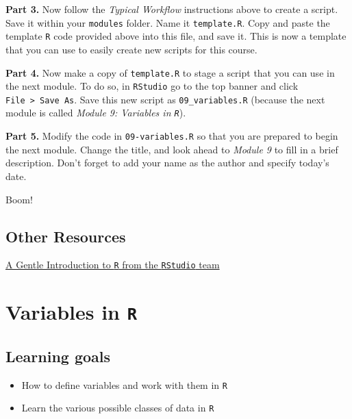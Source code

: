 \documentclass[
]{book}
\providecommand{\tightlist}{%
  \setlength{\itemsep}{0pt}\setlength{\parskip}{0pt}}
\begin{document}
\textbf{Part 3.} Now follow the \emph{Typical Workflow} instructions above to create a script. Save it within your \texttt{modules} folder. Name it \texttt{template.R}. Copy and paste the template \texttt{R} code provided above into this file, and save it. This is now a template that you can use to easily create new scripts for this course.

\textbf{Part 4.} Now make a copy of \texttt{template.R} to stage a script that you can use in the next module. To do so, in \texttt{RStudio} go to the top banner and click \texttt{File\ \textgreater{}\ Save\ As}. Save this new script as \texttt{09\_variables.R} (because the next module is called \emph{Module 9: Variables in \texttt{R}}).

\textbf{Part 5.} Modify the code in \texttt{09-variables.R} so that you are prepared to begin the next module. Change the title, and look ahead to \emph{Module 9} to fill in a brief description. Don't forget to add your name as the author and specify today's date.

Boom!

\hypertarget{other-resources-1}{%
\section*{Other Resources}\label{other-resources-1}}

\href{https://www.rstudio.com/resources/webinars/a-gentle-introduction-to-tidy-statistics-in-r/}{A Gentle Introduction to \texttt{R} from the \texttt{RStudio} team}

\hypertarget{variables-in-r}{%
\chapter{\texorpdfstring{Variables in \texttt{R}}{Variables in R}}\label{variables-in-r}}

\hypertarget{learning-goals-2}{%
\section*{Learning goals}\label{learning-goals-2}}

\begin{itemize}
\tightlist
\item
  How to define variables and work with them in \texttt{R}\\
\item
  Learn the various possible classes of data in \texttt{R}
\end{itemize}
\end{document}
